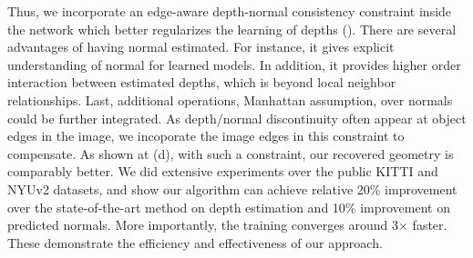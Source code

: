 Thus, we incorporate an edge-aware depth-normal consistency constraint inside the network which better regularizes the learning of depths (). 
There are several advantages of having normal estimated. For instance, it gives explicit understanding of normal for learned models.  In addition, it provides higher order interaction between estimated depths, which is beyond local neighbor relationships. Last, additional operations, \eg Manhattan assumption, over normals could be further integrated. As depth/normal discontinuity often appear at object edges in the image, we incoporate the image edges in this constraint to compensate.
As shown at (d), with such a constraint, our recovered geometry is comparably better. We did extensive experiments over the public KITTI and NYUv2 datasets, and show our algorithm can achieve relative 20$\%$ improvement over the state-of-the-art method on depth estimation and 10$\%$ improvement on predicted normals. More importantly, the training converges around 3$\times$ faster. These demonstrate the efficiency and effectiveness of our approach.




